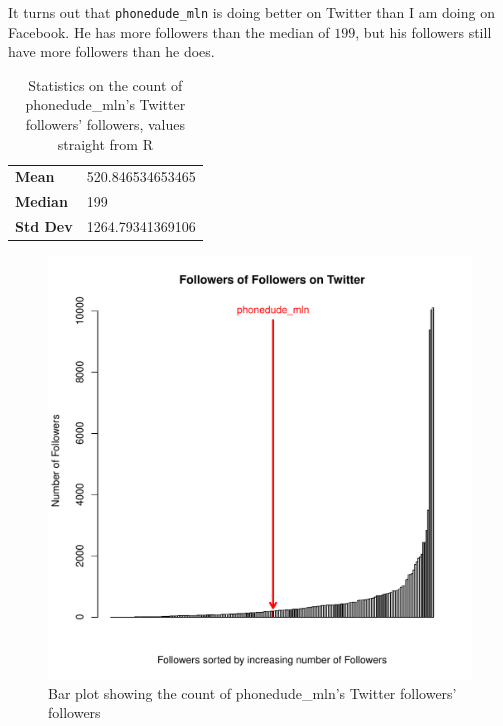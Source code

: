 \documentclass[letterpaper,11pt]{article}
\begin{document}
It turns out that \verb+phonedude_mln+ is doing better on Twitter than I am doing on Facebook.  He has more followers than the median of $199$, but his followers still have more followers than he does.

\begin{table}
\begin{tabular}{ l l }
\hline
\textbf{Mean} & 520.846534653465 \\
\textbf{Median} & 199 \\
\textbf{Std Dev} & 1264.79341369106 \\
\hline
\end{tabular}
\caption{Statistics on the count of phonedude\_mln's Twitter followers' followers, values straight from R}
\label{tab:q2stats}
\end{table}

\clearpage
\begin{figure}[h]
\includegraphics[scale=0.7]{q2/q2-barplot.pdf}
\caption{Bar plot showing the count of phonedude\_mln's Twitter followers' followers}
\label{fig:q2barplot}
\end{figure}


\newpage

\end{document}
